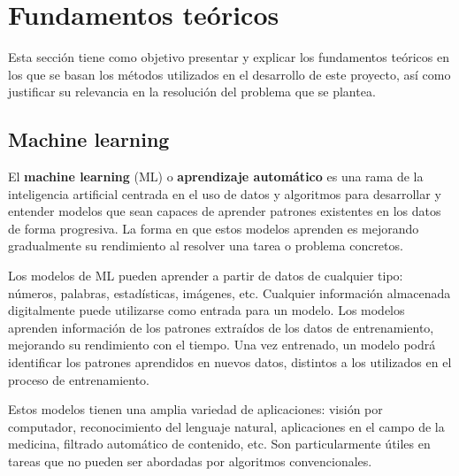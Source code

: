 \chapter{Fundamentos teóricos}
\label{chap:fundamentos}

Esta sección tiene como objetivo presentar y explicar los fundamentos teóricos en los que se basan los métodos utilizados en el desarrollo de este proyecto, así como justificar su relevancia en la resolución del problema que se plantea.

\section{Machine learning}

El \textbf{machine learning} (ML) o \textbf{aprendizaje automático} \cite{bishop2006pattern,alpaydin2020introduction,abu2012learning} es una rama de la inteligencia artificial centrada en el uso de datos y algoritmos para desarrollar y entender modelos que sean capaces de aprender patrones existentes en los datos de forma progresiva. 
La forma en que estos modelos aprenden es mejorando gradualmente su rendimiento al resolver una tarea o problema concretos.

Los modelos de ML pueden aprender a partir de datos de cualquier tipo: números, palabras, estadísticas, imágenes, etc. 
Cualquier información almacenada digitalmente puede utilizarse como entrada para un modelo.
Los modelos aprenden información de los patrones extraídos de los datos de entrenamiento, mejorando su rendimiento con el tiempo. 
Una vez entrenado, un modelo podrá identificar los patrones aprendidos en nuevos datos, distintos a los utilizados en el proceso de entrenamiento.

Estos modelos tienen una amplia variedad de aplicaciones: visión por computador, reconocimiento del lenguaje natural, aplicaciones en el campo de la medicina, filtrado automático de contenido, etc. 
Son particularmente útiles en tareas que no pueden ser abordadas por algoritmos convencionales.\\


